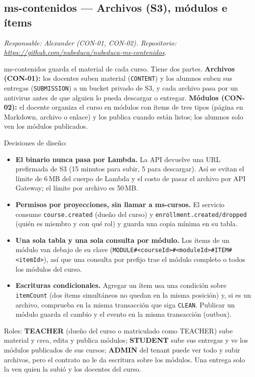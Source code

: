 \subsection{ms-contenidos --- Archivos (S3), módulos e ítems}
\label{sec:ms-contenidos}
\textit{Responsable: Alexander (CON-01, CON-02). Repositorio: \url{https://github.com/nubeduca/nubeduca-ms-contenidos}.}

ms-contenidos guarda el material de cada curso. Tiene dos partes. \textbf{Archivos (CON-01):} los
docentes suben material (\texttt{CONTENT}) y los alumnos suben sus entregas (\texttt{SUBMISSION}) a un
bucket privado de S3, y cada archivo pasa por un antivirus antes de que alguien lo pueda descargar o
entregar. \textbf{Módulos (CON-02):} el docente organiza el curso en módulos con ítems de tres tipos
(página en Markdown, archivo o enlace) y los publica cuando están listos; los alumnos solo ven los
módulos publicados.

Decisiones de diseño:
\begin{itemize}
  \item \textbf{El binario nunca pasa por Lambda.} La API devuelve una URL prefirmada de S3 (15 minutos
        para subir, 5 para descargar). Así se evitan el límite de 6\,MB del cuerpo de Lambda y el costo
        de pasar el archivo por API Gateway; el límite por archivo es 50\,MB.
  \item \textbf{Permisos por proyecciones, sin llamar a ms-cursos.} El servicio consume
        \texttt{course.created} (dueño del curso) y \texttt{enrollment.created/dropped} (quién es
        miembro y con qué rol) y guarda una copia mínima en su tabla.
  \item \textbf{Una sola tabla y una sola consulta por módulo.} Los ítems de un módulo van debajo de su
        clave (\texttt{MODULE\#<courseId>\#<moduleId>\#ITEM\#<itemId>}), así que una consulta por
        prefijo trae el módulo completo o todos los módulos del curso.
  \item \textbf{Escrituras condicionales.} Agregar un ítem usa una condición sobre \texttt{itemCount}
        (dos ítems simultáneos no quedan en la misma posición) y, si es un archivo, comprueba en la
        misma transacción que siga \texttt{CLEAN}. Publicar un módulo guarda el cambio y el evento en
        la misma transacción (outbox).
\end{itemize}

Roles: \textbf{TEACHER} (dueño del curso o matriculado como TEACHER) sube material y crea, edita y
publica módulos; \textbf{STUDENT} sube sus entregas y ve los módulos publicados de sus cursos;
\textbf{ADMIN} del tenant puede ver todo y subir archivos, pero el contrato no le da escritura sobre los
módulos. Una entrega solo la ven quien la subió y los docentes del curso.

